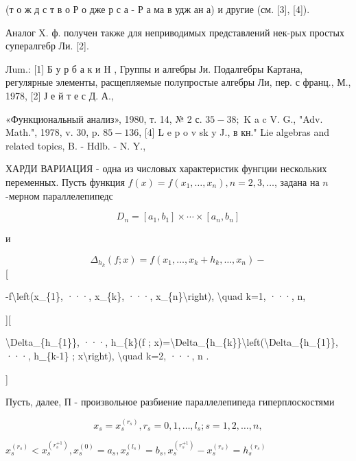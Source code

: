 \documentclass[10pt]{article}
\begin{document}
(т о ж д с т в о Р о дже р с а - Р а ма в удж ан а) и другие (см. [3], [4]).



Аналог X. ф. получен также для неприводимых представлений нек-рых простых супералгебр Ли. [2].



Лum.: [1] Б у р б а к и H , Группы и алгебры Ји. Подалгебры Картана, регулярные элементы, расщепляемые полупростые алгебры Ли, пер. с франц., М., 1978, [2] Ј е й т е с Д. А.,

«Функциональный анализ», 1980, т. 14, № 2 с. $35-38 ;$ K a c V. G., "Adv. Math.", 1978, v. 30, p. $85-136$, [4] L e p o v sk y J., в кн." Lie algebras and related topics, B. - Hdlb. - N. Y.,



ХАРДИ ВАРИАЦИЯ - одна из числовых характеристик фунгции нескольких переменных. Пусть функция $f(x)=f\left(x_{1}, \ldots, x_{n}\right), n=2,3, \ldots$, задана на $n$-мерном параллелепипедс



\[

D_{n}=\left[a_{1}, b_{1}\right] \times \cdots \times\left[a_{n}, b_{n}\right]

\]



и



\[

\Delta_{h_{k}}(f ; x)=f\left(x_{1}, \ldots, x_{k}+h_{k}, \ldots, x_{n}\right)-

\][



-f\textbackslash left(x\_\{1\}, ···, x\_\{k\}, ···, x\_\{n\}\textbackslash right), \textbackslash quad k=1, ···, n,



][



\textbackslash Delta\_\{h\_\{1\}\}, ···, h\_\{k\}(f ; x)=\textbackslash Delta\_\{h\_\{k\}\}\textbackslash left(\textbackslash Delta\_\{h\_\{1\}\}, ···, h\_\{k-1\} ; x\textbackslash right), \textbackslash quad k=2, ···, n .

]



Пусть, далее, П - произвольное разбиение параллелепипеда гиперплоскостями



\[

x_{s}=x_{s}^{\left(r_{s}\right)}, r_{s}=0,1, \ldots, l_{s} ; s=1,2, \ldots, n,

\]



$x_{s}^{\left(r_{s}\right)}<x_{s}^{\left(r_{s}^{+1}\right)}, x_{s}^{(0)}=a_{s}, x_{s}^{\left(l_{s}\right)}=b_{s}, x_{s}^{\left(r_{s}^{+1}\right)}-x_{s}^{\left(r_{s}\right)}=h_{s}^{\left(r_{s}\right)}$
\end{document}
